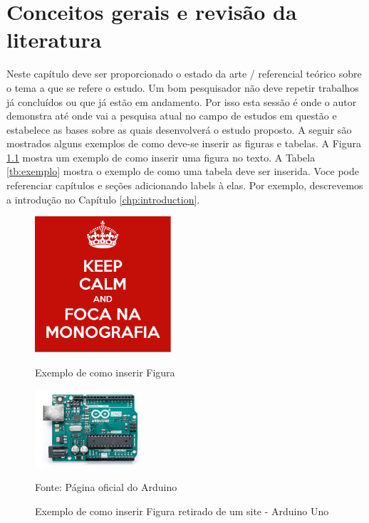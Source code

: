 \chapter{Conceitos gerais e revisão da literatura}
Neste capítulo deve ser proporcionado o estado da arte / referencial teórico
sobre o tema a que se refere o estudo. Um bom pesquisador não deve repetir
trabalhos já concluídos ou que já estão em andamento. Por isso esta sessão é
onde o autor demonstra até onde vai a pesquisa atual no campo de estudos em
questão e estabelece as bases sobre as quais desenvolverá o estudo proposto. A
seguir são mostrados alguns exemplos de como deve-se inserir as figuras e
tabelas. A Figura \ref{fig:exemplo} mostra um exemplo de como inserir uma
figura no texto. A Tabela \ref{tb:exemplo} mostra o exemplo de como uma tabela
deve ser inserida.  Voce pode referenciar capítulos e seções adicionando labels
à elas. Por exemplo, descrevemos a introdução no Capítulo
\ref{chp:introduction}.

\begin{figure}[!htb]
    \centering
    \caption{Exemplo de como inserir Figura}
    \includegraphics[width=0.45\textwidth]{images/figura.png}
    \label{fig:exemplo}
\end{figure}

\newpage

\begin{figure}[!htb]
    \centering
    \caption{Exemplo de como inserir Figura retirado de um site - Arduino Uno}
    \includegraphics[width=0.35\textwidth]{images/uno.png}

    {\footnotesize Fonte: Página oficial do Arduino\protect\footnotemark}
    \label{fig:arduino_uno}
\end{figure}


